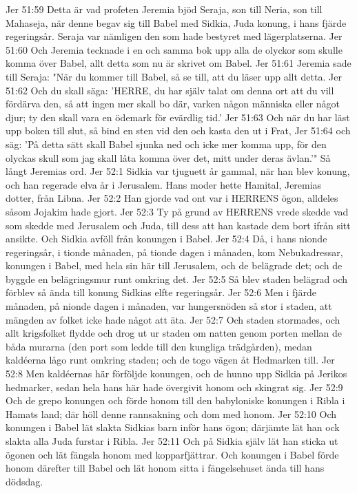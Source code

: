 Jer 51:59  Detta är vad profeten Jeremia bjöd Seraja, son till Neria, son till Mahaseja, när denne begav sig till Babel med Sidkia, Juda konung, i hans fjärde regeringsår. Seraja var nämligen den som hade bestyret med lägerplatserna.
Jer 51:60  Och Jeremia tecknade i en och samma bok upp alla de olyckor som skulle komma över Babel, allt detta som nu är skrivet om Babel.
Jer 51:61  Jeremia sade till Seraja: "När du kommer till Babel, så se till, att du läser upp allt detta.
Jer 51:62  Och du skall säga: 'HERRE, du har själv talat om denna ort att du vill fördärva den, så att ingen mer skall bo där, varken någon människa eller något djur; ty den skall vara en ödemark för evärdlig tid.'
Jer 51:63  Och när du har läst upp boken till slut, så bind en sten vid den och kasta den ut i Frat,
Jer 51:64  och säg: 'På detta sätt skall Babel sjunka ned och icke mer komma upp, för den olyckas skull som jag skall låta komma över det, mitt under deras ävlan.'" Så långt Jeremias ord.
Jer 52:1  Sidkia var tjuguett år gammal, när han blev konung, och han regerade elva år i Jerusalem. Hans moder hette Hamital, Jeremias dotter, från Libna.
Jer 52:2  Han gjorde vad ont var i HERRENS ögon, alldeles såsom Jojakim hade gjort.
Jer 52:3  Ty på grund av HERRENS vrede skedde vad som skedde med Jerusalem och Juda, till dess att han kastade dem bort ifrån sitt ansikte. Och Sidkia avföll från konungen i Babel.
Jer 52:4  Då, i hans nionde regeringsår, i tionde månaden, på tionde dagen i månaden, kom Nebukadressar, konungen i Babel, med hela sin här till Jerusalem, och de belägrade det; och de byggde en belägringsmur runt omkring det.
Jer 52:5  Så blev staden belägrad och förblev så ända till konung Sidkias elfte regeringsår.
Jer 52:6  Men i fjärde månaden, på nionde dagen i månaden, var hungersnöden så stor i staden, att mängden av folket icke hade något att äta.
Jer 52:7  Och staden stormades, och allt krigsfolket flydde och drog ut ur staden om natten genom porten mellan de båda murarna (den port som ledde till den kungliga trädgården), medan kaldéerna lågo runt omkring staden; och de togo vägen åt Hedmarken till.
Jer 52:8  Men kaldéernas här förföljde konungen, och de hunno upp Sidkia på Jerikos hedmarker, sedan hela hans här hade övergivit honom och skingrat sig.
Jer 52:9  Och de grepo konungen och förde honom till den babyloniske konungen i Ribla i Hamats land; där höll denne rannsakning och dom med honom.
Jer 52:10  Och konungen i Babel lät slakta Sidkias barn inför hans ögon; därjämte lät han ock slakta alla Juda furstar i Ribla.
Jer 52:11  Och på Sidkia själv lät han sticka ut ögonen och lät fängsla honom med kopparfjättrar. Och konungen i Babel förde honom därefter till Babel och lät honom sitta i fängelsehuset ända till hans dödsdag.
